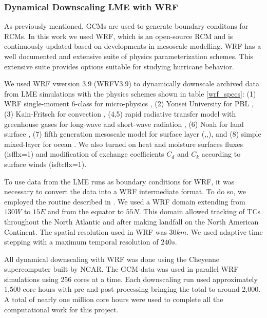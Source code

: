 \subsubsection{Dynamical Downscaling LME with WRF}
\label{WRF}
As previously mentioned, GCMs are used to generate boundary conditons for RCMs. In this work we used WRF, which is an open-source RCM and is continuously updated based on developments in mesoscale modelling. WRF has a well documented and extensive suite of physics parameterization schemes. This extensive suite provides options suitable for studying hurricane behavior. 
\par
We used WRF vwersion 3.9 (WRFV3.9) \cite{wrf_tech} to dynamically downscale archived data from LME simulations with the physics schemes shown in table \ref{wrf_specs}: (1) WRF single-moment 6-class for micro-physics \cite{mp_phys}, (2) Yonsei University for PBL \cite{pbl_phys}, (3) Kain-Fritsch for convection \cite{cu_phys}, (4,5) rapid radiative transfer model with greenhouse gases for long-wave and short-wave radiation \cite{rad_phys}, (6) Noah for land surface \cite{sfc_phys}, (7) fifth generation mesoscale model for surface layer (\cite{sfclay_phys:1},\cite{sfclay_phys:2},\cite{sfclay_phys:3}), and (8) simple mixed-layer for ocean \cite{ocn_phys}. We also turned on heat and moisture surfaces fluxes (isfflx=1) and modification of exchange coefficients $C_d$ and $C_k$ according to surface winds (isftcflx=1). 
\par
To use data from the LME runs as boundary conditions for WRF, it was necessary to convert the data into a WRF intermediate format. To do so, we employed the routine described in \cite{tech_notes}. We used a WRF domain extending from $130W$ to $15E$ and from the equator to $55N$. This domain allowed tracking of TCs throughout the North Atlantic and after making landfall on the North American Continent. The spatial resolution used in WRF was $30km$. We used adaptive time stepping with a maximum temporal resolution of $240s$.
\par
All dynamical downscaling with WRF was done using the Cheyenne supercomputer built by NCAR. The GCM data was used in parallel WRF simulations using 256 cores at a time. Each downscaling run used approximately 1,500 core hours with pre and post-processing bringing the total to around 2,000. A total of nearly one million core hours were used to complete all the computational work for this project.  

